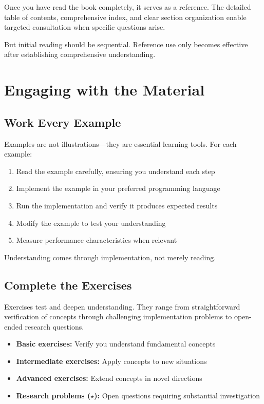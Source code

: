 Once you have read the book completely, it serves as a reference. The detailed table of contents, comprehensive index, and clear section organization enable targeted consultation when specific questions arise.

But initial reading should be sequential. Reference use only becomes effective after establishing comprehensive understanding.

\section*{Engaging with the Material}

\subsection*{Work Every Example}

Examples are not illustrations—they are essential learning tools. For each example:

\begin{enumerate}
    \item Read the example carefully, ensuring you understand each step
    \item Implement the example in your preferred programming language
    \item Run the implementation and verify it produces expected results
    \item Modify the example to test your understanding
    \item Measure performance characteristics when relevant
\end{enumerate}

Understanding comes through implementation, not merely reading.

\subsection*{Complete the Exercises}

Exercises test and deepen understanding. They range from straightforward verification of concepts through challenging implementation problems to open-ended research questions.

\begin{itemize}
    \item \textbf{Basic exercises:} Verify you understand fundamental concepts
    \item \textbf{Intermediate exercises:} Apply concepts to new situations
    \item \textbf{Advanced exercises:} Extend concepts in novel directions
    \item \textbf{Research problems ($\star$):} Open questions requiring substantial investigation
\end{itemize}

